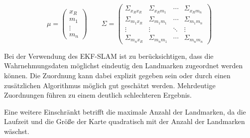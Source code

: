 \begin{equation}
\mu = \begin{pmatrix} x_R \\ m_1 \\ \vdots \\ m_n \end{pmatrix}
\qquad
\Sigma = \begin{pmatrix}
	\Sigma_{x_R x_R} & \Sigma_{x_R m_1} & \cdots & \Sigma_{x_R m_n} \\
	\Sigma_{m_1 x_R} & \Sigma_{m_1 m_1} & \cdots & \Sigma_{m_1 m_n} \\
	\vdots & \vdots & \ddots & \vdots \\
	\Sigma_{m_n x_R} & \Sigma_{m_n m_1} & \cdots & \Sigma_{m_n m_n}
\end{pmatrix}
\label{eq:ekf_slam_mu_sigma}
\end{equation}

Bei der Verwendung des EKF-SLAM ist zu berücksichtigen, dass die Wahrnehmungsdaten möglichst eindeutig den Landmarken zugeordnet werden können. Die Zuordnung kann dabei explizit gegeben sein oder durch einen zusätzlichen Algorithmus möglich gut geschätzt werden. Mehrdeutige Zuordnungen führen zu einem deutlich schlechteren Ergebnis.

Eine weitere Einschränkt betrifft die maximale Anzahl der Landmarken, da die Laufzeit und die Größe der Karte quadratisch mit der Anzahl der Landmarken wäschst.


%
%
